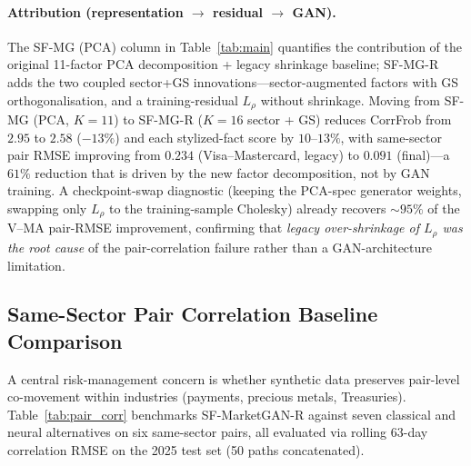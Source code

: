 \paragraph{Attribution (representation $\to$ residual $\to$ GAN).}
The SF-MG (PCA) column in Table~\ref{tab:main} quantifies the contribution of the original 11-factor PCA decomposition + legacy shrinkage baseline; SF-MG-R adds the two coupled sector+GS innovations---sector-augmented factors with GS orthogonalisation, and a training-residual $L_\rho$ without shrinkage. Moving from SF-MG (PCA, $K=11$) to SF-MG-R ($K=16$ sector + GS) reduces CorrFrob from $2.95$ to $2.58$ ($-13\%$) and each stylized-fact score by $10$--$13\%$, with same-sector pair RMSE improving from $0.234$ (Visa--Mastercard, legacy) to $0.091$ (final)---a $61\%$ reduction that is driven by the new factor decomposition, not by GAN training. A checkpoint-swap diagnostic (keeping the PCA-spec generator weights, swapping only $L_\rho$ to the training-sample Cholesky) already recovers $\sim 95\%$ of the V--MA pair-RMSE improvement, confirming that \emph{legacy over-shrinkage of $L_\rho$ was the root cause} of the pair-correlation failure rather than a GAN-architecture limitation.

\subsection{Same-Sector Pair Correlation Baseline Comparison}
\label{sec:pair_corr_baselines}

A central risk-management concern is whether synthetic data preserves pair-level co-movement within industries (payments, precious metals, Treasuries). Table~\ref{tab:pair_corr} benchmarks SF-MarketGAN-R against seven classical and neural alternatives on six same-sector pairs, all evaluated via rolling $63$-day correlation RMSE on the 2025 test set (50 paths concatenated).

